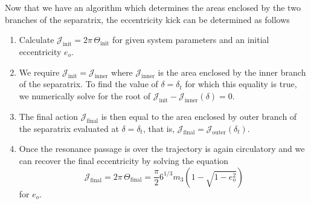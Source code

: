 Now that we have an algorithm which determines the areas enclosed by the two
branches of the separatrix, the eccentricity kick can be determined as
follows
\begin{enumerate}
    \item Calculate $\mathcal{J}_\text{init}=2\pi\,\Theta_\text{init}$ for given
        system parameters and an initial eccentricity $e_o$.\\
    \item We require $\mathcal{J}_\text{init}=\mathcal{J}_\text{inner}$ 
        where $\mathcal{J}_\text{inner}$ is the area enclosed by the inner
        branch of the separatrix. To find the value of $\delta=\delta_t$ for
        which this equality is true, we numerically solve for the root of
        $\mathcal{J}_\text{init}-\mathcal{J}_\text{inner}(\delta)=0$.
    \item The final action $\mathcal{J}_\text{final}$ is then equal to
        the area enclosed by outer branch of the separatrix evaluated at
        $\delta=\delta_t$, that is, $\mathcal{J}_\text{final}=
        \mathcal{J}_\text{outer}(\delta_t)$.
    \item Once the resonance passage is over the trajectory is again circulatory
        and we can recover the final eccentricity by solving the equation
        \begin{equation}
            \mathcal{J}_\text{final}=2\pi\,\Theta_\text{final}=
            \frac{\pi}{2} 6^{1/3}m_3\left(1-\sqrt{1-e_o^2}\right)
        \end{equation}
        for $e_o$. 
\end{enumerate}

